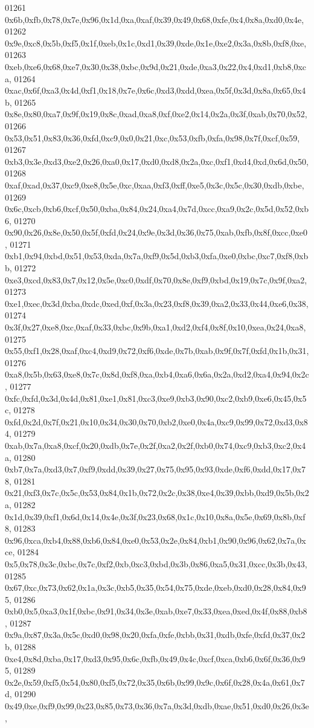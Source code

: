 \begin{DoxyCode}
01261   0x6b,0xfb,0x78,0x7e,0x96,0x1d,0xa,0xaf,0x39,0x49,0x68,0xfe,0x4,0x8a,0xd0,0x4e,
01262   0x9e,0xc8,0x5b,0xf5,0x1f,0xeb,0x1c,0xd1,0x39,0xde,0x1e,0xe2,0x3a,0x8b,0xf8,0xe,
01263   0xeb,0xe6,0x68,0xe7,0x30,0x38,0xbc,0x9d,0x21,0xde,0xa3,0x22,0x4,0xd1,0xb8,0xca,
01264   0xac,0x6f,0xa3,0x4d,0xf1,0x18,0x7e,0x6c,0xd3,0xdd,0xea,0x5f,0x3d,0x8a,0x65,0x4b,
01265   0x8e,0x80,0xa7,0x9f,0x19,0x8c,0xad,0xa8,0xf,0xe2,0x14,0x2a,0x3f,0xab,0x70,0x52,
01266   0x53,0x51,0x83,0x36,0xfd,0xc9,0x0,0x21,0xc,0x53,0xfb,0xfa,0x98,0x7f,0xcf,0x59,
01267   0xb3,0x3e,0xd3,0xe2,0x26,0xa0,0x17,0xd0,0xd8,0x2a,0xc,0xf1,0xd4,0xd,0x6d,0x50,
01268   0xaf,0xad,0x37,0xc9,0xe8,0x5e,0xc,0xaa,0xf3,0xff,0xe5,0x3c,0x5c,0x30,0xdb,0xbe,
01269   0x6c,0xcb,0xb6,0xcf,0x50,0xba,0x84,0x24,0xa4,0x7d,0xcc,0xa9,0x2c,0x5d,0x52,0xb6,
01270   0x90,0x26,0x8e,0x50,0x5f,0xfd,0x24,0x9e,0x3d,0x36,0x75,0xab,0xfb,0x8f,0xcc,0xe0,
01271   0xb1,0x94,0xbd,0x51,0x53,0xda,0x7a,0xf9,0x5d,0xb3,0xfa,0xe0,0xbc,0xc7,0xf8,0xbb,
01272   0xe3,0xcd,0x83,0x7,0x12,0x5e,0xc0,0xdf,0x70,0x8e,0xf9,0xbd,0x19,0x7c,0x9f,0xa2,
01273   0xe1,0xec,0x3d,0xba,0xdc,0xed,0xf,0x3a,0x23,0xf8,0x39,0xa2,0x33,0x44,0xe6,0x38,
01274   0x3f,0x27,0xe8,0xc,0xaf,0x33,0xbc,0x9b,0xa1,0xd2,0xf4,0x8f,0x10,0xea,0x24,0xa8,
01275   0x55,0xf1,0x28,0xaf,0xc4,0xd9,0x72,0xf6,0xde,0x7b,0xab,0x9f,0x7f,0xfd,0x1b,0x31,
01276   0xa8,0x5b,0x63,0xe8,0x7c,0x8d,0xf8,0xa,0xb4,0xa6,0x6a,0x2a,0xd2,0xa4,0x94,0x2c,
01277   0xfc,0xfd,0x3d,0x4d,0x81,0xe1,0x81,0xc3,0xe9,0xb3,0x90,0xc2,0xb9,0xe6,0x45,0x5c,
01278   0xfd,0x2d,0x7f,0x21,0x10,0x34,0x30,0x70,0xb2,0xe0,0x4a,0xc9,0x99,0x72,0xd3,0x84,
01279   0xab,0x7a,0xa8,0xcf,0x20,0xdb,0x7e,0x2f,0xa2,0x2f,0xb0,0x74,0xc9,0xb3,0xc2,0x4a,
01280   0xb7,0x7a,0xd3,0x7,0xf9,0xdd,0x39,0x27,0x75,0x95,0x93,0xde,0xf6,0xdd,0x17,0x78,
01281   0x21,0xf3,0x7c,0x5c,0x53,0x84,0x1b,0x72,0x2c,0x38,0xe4,0x39,0xbb,0xd9,0x5b,0x2a,
01282   0x1d,0x39,0xf1,0x6d,0x14,0x4e,0x3f,0x23,0x68,0x1c,0x10,0x8a,0x5e,0x69,0x8b,0xf8,
01283   0x96,0xca,0xb4,0x88,0xb6,0x84,0xe0,0x53,0x2e,0x84,0xb1,0x90,0x96,0x62,0x7a,0xce,
01284   0x5,0x78,0x3c,0xbc,0x7c,0xf2,0xb,0xc3,0xbd,0x3b,0x86,0xa5,0x31,0xcc,0x3b,0x43,
01285   0x67,0xc,0x73,0x62,0x1a,0x3c,0xb5,0x35,0x54,0x75,0xde,0xeb,0xd0,0x28,0x84,0x95,
01286   0xb0,0x5,0xa3,0x1f,0xbc,0x91,0x34,0x3e,0xab,0xe7,0x33,0xea,0xed,0x4f,0x88,0xb8,
01287   0x9a,0x87,0x3a,0x5c,0xd0,0x98,0x20,0xfa,0xfe,0xbb,0x31,0xdb,0xfe,0xfd,0x37,0x2b,
01288   0xe4,0x8d,0xba,0x17,0xd3,0x95,0x6c,0xfb,0x49,0x4c,0xcf,0xca,0xb6,0x6f,0x36,0x95,
01289   0x2e,0x59,0xf5,0x54,0x80,0xf5,0x72,0x35,0x6b,0x99,0x9c,0x6f,0x28,0x4a,0x61,0x7d,
01290   0x49,0xe,0xf9,0x99,0x23,0x85,0x73,0x36,0x7a,0x3d,0xdb,0xae,0x51,0xd0,0x26,0x3e,

\end{DoxyCode}
